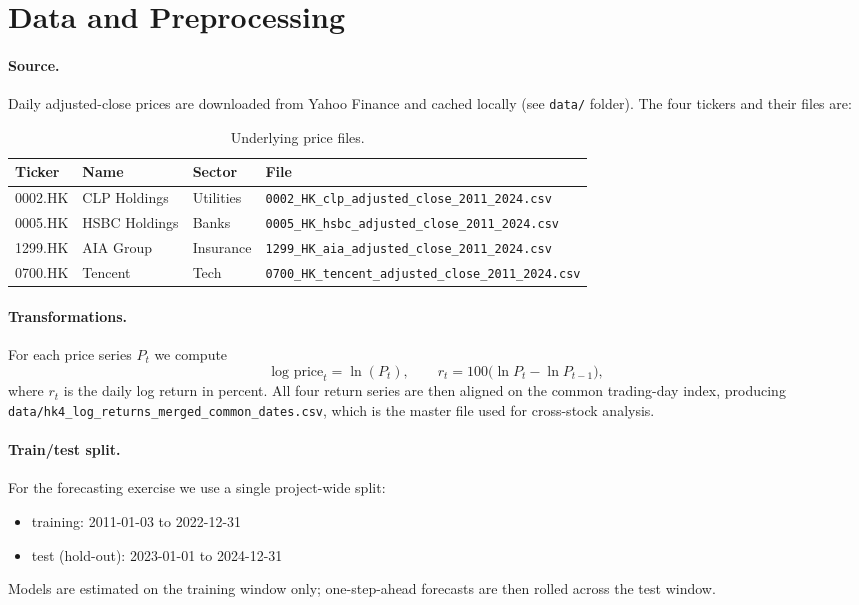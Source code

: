 \documentclass[11pt,a4paper]{article}
\begin{document}
\section{Data and Preprocessing}
\label{sec:data}

\paragraph{Source.}
Daily adjusted-close prices are downloaded from Yahoo Finance and
cached locally (see \texttt{data/} folder).  The four tickers and
their files are:

\begin{table}[H]
\centering
\small
\begin{tabular}{llll}
\toprule
Ticker & Name & Sector & File \\
\midrule
0002.HK & CLP Holdings   & Utilities  & \texttt{0002\_HK\_clp\_adjusted\_close\_2011\_2024.csv} \\
0005.HK & HSBC Holdings  & Banks      & \texttt{0005\_HK\_hsbc\_adjusted\_close\_2011\_2024.csv} \\
1299.HK & AIA Group      & Insurance  & \texttt{1299\_HK\_aia\_adjusted\_close\_2011\_2024.csv} \\
0700.HK & Tencent        & Tech       & \texttt{0700\_HK\_tencent\_adjusted\_close\_2011\_2024.csv} \\
\bottomrule
\end{tabular}
\caption{Underlying price files.}
\end{table}

\paragraph{Transformations.}
For each price series $P_t$ we compute
\[
  \text{log price}_t = \ln(P_t),\qquad
  r_t = 100\bigl(\ln P_t - \ln P_{t-1}\bigr),
\]
where $r_t$ is the daily log return in percent.  All four return
series are then aligned on the common trading-day index, producing
\texttt{data/hk4\_log\_returns\_merged\_common\_dates.csv}, which is
the master file used for cross-stock analysis.

\paragraph{Train/test split.}
For the forecasting exercise we use a single project-wide split:
\begin{itemize}[leftmargin=*]
  \item training: 2011-01-03 to 2022-12-31
  \item test (hold-out): 2023-01-01 to 2024-12-31
\end{itemize}
Models are estimated on the training window only; one-step-ahead
forecasts are then rolled across the test window.
\end{document}
